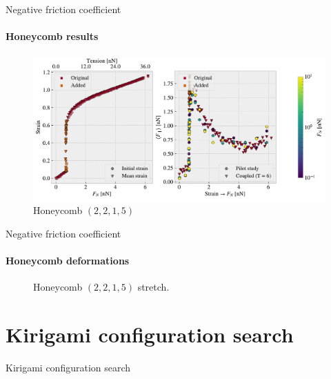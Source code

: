 \documentclass[
	10pt, %
]{beamer}
\begin{document}
\begin{frame}{Negative friction coefficient}
	\framesubtitle{Honeycomb results}
	\begin{figure}[H]
		\centering
		\includegraphics[width=\linewidth]{../thesis/figures/negative_coefficient/manual_coupling_tension_hon2215.pdf}	
	\caption{Honeycomb $(2,2,1,5)$}
	\end{figure}	
\end{frame}
%
%
\begin{frame}{Negative friction coefficient}
	\framesubtitle{Honeycomb deformations}
	\begin{figure}
		\centering    
		\caption{Honeycomb $(2,2,1,5)$ stretch.}
	\end{figure} 
\end{frame}
%
%
\section{Kirigami configuration search} %
\begin{frame}{Kirigami configuration search}
    \tableofcontents[currentsection]
\end{frame}
%
%
\end{document}
